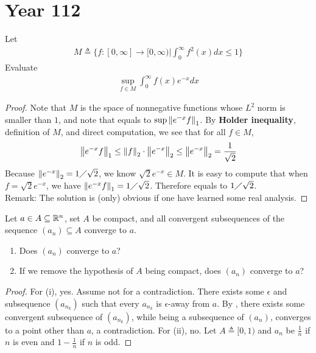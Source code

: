 \documentclass{report}
\begin{document}
\section{Year 112}
\begin{question}{}{}
Let 
\begin{align*}
M\triangleq \Bigg\{f:[0,\infty]\rightarrow [0,\infty)\Bigg| \int_0^{\infty}f^2(x)dx \leq 1\Bigg\}
\end{align*}
Evaluate 
\begin{align}
\label{fM}
\sup_{f\in M}\int_0^{\infty}f(x)e^{-x}dx
\end{align}
\end{question}
\begin{proof}
Note that $M$ is the space of nonnegative functions whose  $L^2$ norm is smaller than  $1$, and note that  equals to $\sup \left\| e^{-x}f \right\|_1$. By \textbf{Holder inequality}, definition of $M$, and direct computation, we see that for all $f \in M$,    
\begin{align*}
\left\| e^{-x}f \right\|_1 \leq \left\| f \right\|_2 \cdot \left\| e^{-x} \right\|_2 \leq \left\| e^{-x} \right\|_2= \frac{1}{\sqrt{2}}
\end{align*}
Because $\left\| e^{-x} \right\|_2= 1 \diagup \sqrt{2}$, we know $\sqrt{2}e^{-x} \in M$. It is easy to compute that when $f=\sqrt{2}e^{-x}$, we have $\left\| e^{-x}f \right\|_1=1 \diagup \sqrt{2}$.   Therefore  equals to $1\diagup \sqrt{2}$. \\

Remark: The solution is (only) obvious if one have learned some real analysis.  
\end{proof}
\begin{question}{}{}
Let $a \in A \subseteq \mathbb{R}^n$, set $A$ be compact, and all convergent subsequences of the sequence $(a_n)\subseteq A$ converge to $a$. 
 \begin{enumerate}[label=(\roman*)]
   \item Does $(a_n)$ converge to  $a$? 
   \item If we remove the hypothesis of $A$ being compact, does  $(a_n)$ converge to $a$?  
\end{enumerate}
\end{question}
\begin{proof}
For (i), yes. Assume not for a contradiction. There exists some $\epsilon $ and subsequence $(a_{n_k})$ such that every $a_{n_k}$ is $\epsilon $-away from $a$. By , there exists some convergent subsequence of $(a_{n_k})$, while being a subsequence of $(a_n)$, converges to a point other than $a$, a contradiction. For (ii), no. Let $A\triangleq [0,1)$ and $a_n$ be  $\frac{1}{n}$ if $n$ is even and  $1-\frac{1}{n}$ if $n$ is odd. 
\end{proof}
\end{document}
